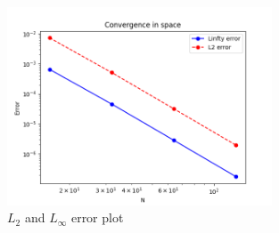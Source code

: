 \documentclass{article}
\begin{document}
\begin{figure}[h!]
    \centering
    \includegraphics[width=0.7\textwidth]{error.png}
    \caption{$L_{2}$ and $L_{\infty}$ error plot}
\end{figure}
\end{document}
